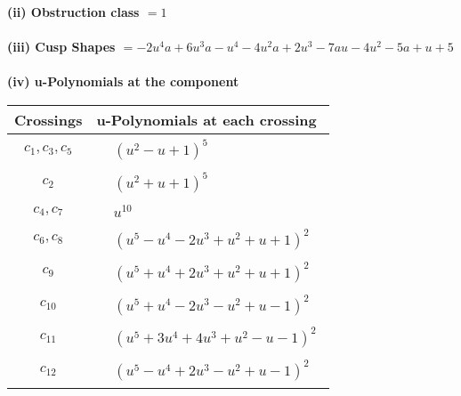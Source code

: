 \documentclass[1p]{elsarticle_modified}
\theoremstyle{definition}
\begin{document}
\flushleft \textbf{(ii) Obstruction class $= 1$}\\~\\
\flushleft \textbf{(iii) Cusp Shapes $= -2 u^4 a+6 u^3 a- u^4-4 u^2 a+2 u^3-7 a u-4 u^2-5 a+u+5$}\\~\\
\newpage\renewcommand{\arraystretch}{1}
\flushleft \textbf{(iv) u-Polynomials at the component}\newline \\
\begin{tabular}{m{50pt}|m{274pt}}
Crossings & \hspace{64pt}u-Polynomials at each crossing \\
\hline $$\begin{aligned}c_{1},c_{3},c_{5}\end{aligned}$$&$\begin{aligned}
&(u^2- u+1)^5
\end{aligned}$\\
\hline $$\begin{aligned}c_{2}\end{aligned}$$&$\begin{aligned}
&(u^2+u+1)^5
\end{aligned}$\\
\hline $$\begin{aligned}c_{4},c_{7}\end{aligned}$$&$\begin{aligned}
&u^{10}
\end{aligned}$\\
\hline $$\begin{aligned}c_{6},c_{8}\end{aligned}$$&$\begin{aligned}
&(u^5- u^4-2 u^3+u^2+u+1)^2
\end{aligned}$\\
\hline $$\begin{aligned}c_{9}\end{aligned}$$&$\begin{aligned}
&(u^5+u^4+2 u^3+u^2+u+1)^2
\end{aligned}$\\
\hline $$\begin{aligned}c_{10}\end{aligned}$$&$\begin{aligned}
&(u^5+u^4-2 u^3- u^2+u-1)^2
\end{aligned}$\\
\hline $$\begin{aligned}c_{11}\end{aligned}$$&$\begin{aligned}
&(u^5+3 u^4+4 u^3+u^2- u-1)^2
\end{aligned}$\\
\hline $$\begin{aligned}c_{12}\end{aligned}$$&$\begin{aligned}
&(u^5- u^4+2 u^3- u^2+u-1)^2
\end{aligned}$\\
\hline
\end{tabular}\\~\\
\end{document}
